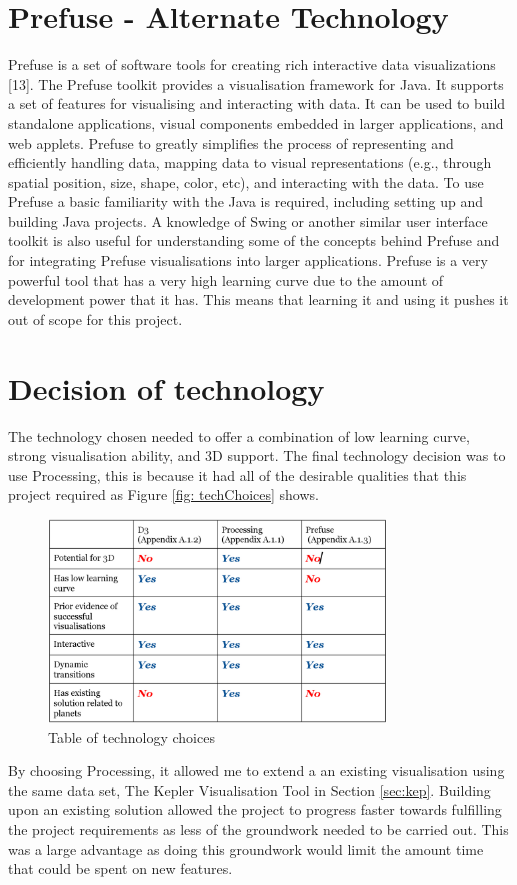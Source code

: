 \section{Prefuse - Alternate Technology}
Prefuse is a set of software tools for creating rich interactive data
visualizations [13]. The
Prefuse toolkit provides a visualisation framework for Java. It supports a set
of features
for visualising and interacting with data. It can be used to build standalone
applications, visual
components embedded
in larger applications, and web applets. Prefuse to greatly simplifies the
process
of representing and efficiently handling data, mapping data to visual
representations (e.g.,
through spatial position, size, shape, color, etc), and interacting with the
data.
To use Prefuse a basic familiarity with the Java is required, including setting
up and building
Java projects. A knowledge of Swing or another similar user interface toolkit is
also
useful for understanding some of the concepts behind Prefuse and for integrating
Prefuse
visualisations into larger applications. Prefuse is a very powerful tool that
has a very high learning curve due
to the amount of development power that it has. This means that learning it and
using it pushes it out of scope for this project.


\section{Decision of technology}

The technology chosen needed to offer a combination of low learning curve,
strong visualisation ability, and 3D support.
The final technology decision was to use Processing, this is because it had all
of the desirable qualities that this project required as Figure \ref{fig:
techChoices} shows. 

\begin{figure}[H]
  \centering
      \includegraphics[width=0.8\textwidth]{images/table_technologies.jpg}
  \caption{Table of technology choices}
  \label{fig: techChoices}
\end{figure}

By choosing Processing, it allowed me to extend a an existing visualisation
using the same data set, The Kepler Visualisation Tool in Section \ref{sec:kep}.
Building upon an existing solution allowed the project to progress faster
towards fulfilling the project requirements as less of the groundwork needed to
be carried out. This was a large advantage as doing this groundwork would limit
the amount time that could be spent on new features.


